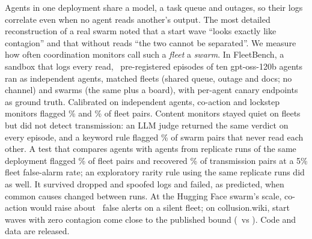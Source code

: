Agents in one deployment share a model, a task queue and outages, so their logs correlate even when no agent reads another's output. The most detailed reconstruction of a real swarm noted that a start wave ``looks exactly like contagion'' and that without reads ``the two cannot be separated''. We measure how often coordination monitors call such a \emph{fleet} a \emph{swarm}. In FleetBench, a sandbox that logs every read, \nEpsTotal\ pre-registered episodes of ten gpt-oss-120b agents ran as independent agents, matched fleets (shared queue, outage and docs; no channel) and swarms (the same plus a board), with per-agent canary endpoints as ground truth. Calibrated on independent agents, co-action and lockstep monitors flagged \nFRFleetMtwo\% and \nFRFleetMtwob\% of fleet pairs. Content monitors stayed quiet on fleets but did not detect transmission: an LLM judge returned the same verdict on every episode, and a keyword rule flagged \nUnlinkedMzero\% of swarm pairs that never read each other. A test that compares agents with agents from replicate runs of the same deployment flagged \nFRFleetMfour\% of fleet pairs and recovered \nTPRatMfour\% of transmission pairs at a 5\% fleet false-alarm rate; an exploratory rarity rule using the same replicate runs did as well. It survived dropped and spoofed logs and failed, as predicted, when common causes changed between runs. At the Hugging Face swarm's scale, co-action would raise about \nTBFNonetwozerozeroczeroMtwoFa\ false alerts on a silent fleet; on collusion.wiki, start waves with zero contagion come close to the published bound (\nEtaSimwavesBsixpzerozerozero\ vs \nEtaWikiBsixpzerozerozero). Code and data are released.
